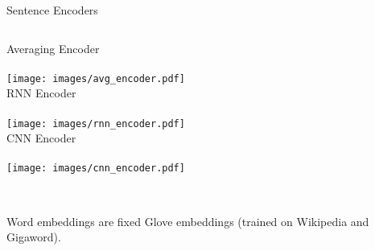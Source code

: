 \begin{frame}{Sentence Encoders}
 \begin{columns}[t]
   \centering
   Averaging Encoder\\~\\
   \texttt{[image: images/avg\_encoder.pdf]}\\
   \centering
   RNN Encoder\\~\\
   \texttt{[image: images/rnn\_encoder.pdf]}\\
   \centering
   CNN Encoder\\~\\
   \texttt{[image: images/cnn\_encoder.pdf]}\\
 \end{columns}

~\\
  Word embeddings are fixed Glove embeddings (trained on Wikipedia and 
    Gigaword). 

\end{frame}
%


